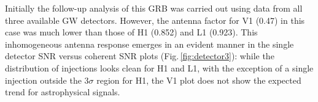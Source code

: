 \documentclass[binding=0.6cm, LaM]{sapthesis}
\begin{document}
	Initially the follow-up analysis of this GRB was carried out using data from all three available GW detectors.
        However, the antenna factor for V1 (0.47) in this case was much lower than those of H1 (0.852) and L1 (0.923).
        This inhomogeneous antenna response emerges in an evident manner in the  single detector SNR versus coherent SNR plots (Fig.\,\ref{fig:detector3}):
        while the distribution of injections looks clean for H1 and L1, with the exception of a single injection outside the $3 \sigma$ region for H1,
        the V1 plot does not show the expected trend for astrophysical signals.
        \begin{figure}[!t]
          \noindent
          \label{detector3}

\end{figure}
\end{document}
